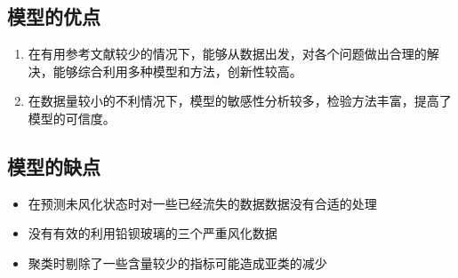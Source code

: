 \documentclass{my_paper}
\begin{document}
\subsection{模型的优点}
\begin{enumerate}
    \item 在有用参考文献较少的情况下，能够从数据出发，对各个问题做出合理的解决，能够综合利用多种模型和方法，创新性较高。
    \item 在数据量较小的不利情况下，模型的敏感性分析较多，检验方法丰富，提高了模型的可信度。

\end{enumerate}

\subsection{模型的缺点}
\begin{itemize}
    \item 在预测未风化状态时对一些已经流失的数据数据没有合适的处理
    \item 没有有效的利用铅钡玻璃的三个严重风化数据
    \item 聚类时剔除了一些含量较少的指标可能造成亚类的减少
\end{itemize}

\newpage
\begin{center}
\end{center}

\newpage
\end{document}
